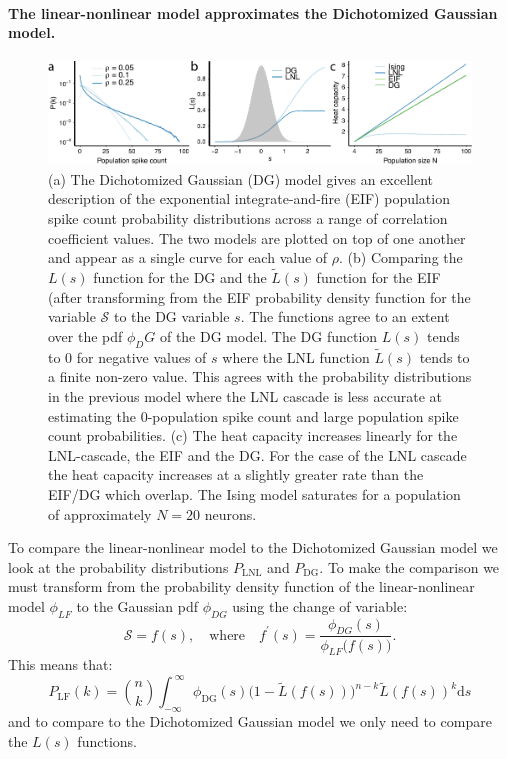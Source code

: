 \documentclass[%
 reprint,
 amsmath,amssymb,
 aps,
floatfix,
]{revtex4-1}
\newcommand{\dd}{\mathrm{d}}
\begin{document}
\paragraph*{The linear-nonlinear model approximates the Dichotomized Gaussian model.}
\begin{figure}
\includegraphics{../R/fig_4/fig_4.pdf}
\caption{\label{fig:lnldgcomp} (a) The Dichotomized Gaussian (DG) model gives an excellent description of the exponential integrate-and-fire (EIF) population spike count probability distributions across a range of correlation coefficient values. The two models are plotted on top of one another and appear as a single curve for each value of $\rho$. (b) Comparing the $L(s)$ function for the DG and the $\tilde{L}(s)$ function for the EIF (after transforming from the EIF probability density function for the variable $\mathcal{S}$ to the DG variable $s$. The functions agree to an extent over the pdf $\phi_DG$ of the DG model. The DG function $L(s)$ tends to $0$ for negative values of $s$ where the LNL function $\tilde{L}(s)$ tends to a finite non-zero value. This agrees with the probability distributions in the previous model where the LNL cascade is less accurate at estimating the $0$-population spike count and large population spike count probabilities. (c) The heat capacity increases linearly for the LNL-cascade, the EIF and the DG. For the case of the LNL cascade the heat capacity increases at a slightly greater rate than the EIF/DG which overlap. The Ising model saturates for a population of approximately $N=20$ neurons.}
\end{figure}
To compare the linear-nonlinear model to the Dichotomized Gaussian model we look at the probability distributions $P_{\text{LNL}}$ and $P_{\text{DG}}$. To make the comparison we must transform from the probability density function of the linear-nonlinear model $\phi_{LF}$ to the Gaussian pdf $\phi_{DG}$ using the change of variable:
\begin{equation}
\mathcal{S} = f(s),\quad\text{where}\quad f^\prime(s) = \frac{\phi_{DG}(s)}{\phi_{LF}\big(f(s)\big)}.
\end{equation}
This means that:
\begin{equation}
P_{\text{LF}}(k) = \binom{n}{k}\!\!\int_{-\infty}^{~\infty} \phi_{\text{DG}}(s) \big(1-\tilde{L}(f(s))\big)^{n-k} \tilde{L}(f(s))^{k} \dd s
\end{equation}
and to compare to the Dichotomized Gaussian model we only need to compare the $L(s)$ functions. \colorbox{BrickRed}{\color{White}{Incomplete.}}
\end{document}
